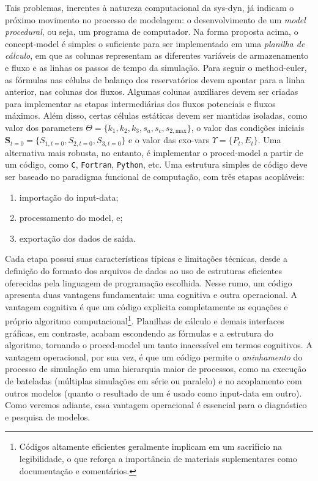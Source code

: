 \documentclass[./main.tex]{subfiles}
\begin{document}
\par Tais problemas, inerentes à natureza computacional da \gls{sys-dyn}, já indicam o próximo movimento no processo de modelagem: o desenvolvimento de um \textit{\gls{model} procedural}, ou seja, um programa de computador. Na forma proposta acima, o \gls{concept-model} é simples o suficiente para ser implementado em uma \textit{planilha de cálculo}, em que as colunas representam as diferentes variáveis de armazenamento e fluxo e as linhas os passos de tempo da simulação. Para seguir o \gls{method-euler}, as fórmulas nas células de balanço dos reservatórios devem apontar para a linha anterior, nas colunas dos fluxos. Algumas colunas auxiliares devem ser criadas para implementar as etapas intermediárias dos fluxos potenciais e fluxos máximos. Além disso, certas células estáticas devem ser mantidas isoladas, como valor dos \gls{parameters} $\Theta = \{k_1, k_2, k_3, s_a, s_c, s_{2, \text{max}}\}$, o valor das condições iniciais $\textbf{S}_{t=0} = \{S_{1, t=0}, S_{2, t=0}, S_{3, t=0}\}$ e o valor das \gls{exo-vars} $\Upsilon = \{P_t, E_t\}$. Uma alternativa mais robusta, no entanto, é implementar o \gls{proced-model} a partir de um código, como \texttt{C}, \texttt{Fortran}, \texttt{Python}, etc. Uma estrutura simples de código deve ser baseado no \gls{paradigma} funcional de computação, com três etapas acopláveis: 
\begin{enumerate}
    \item importação do \gls{input-data};
    \item processamento do \gls{model}, e;
    \item exportação dos dados de saída.
\end{enumerate}
Cada etapa possui suas características típicas e limitações técnicas, desde a definição do formato dos arquivos de dados ao uso de estruturas eficientes oferecidas pela linguagem de programação escolhida. Nesse rumo, um código apresenta duas vantagens fundamentais: uma cognitiva e outra operacional. A vantagem cognitiva é que um código explicita completamente as equações e próprio algoritmo computacional\footnote{Códigos altamente eficientes geralmente implicam em um sacrifício na legibilidade, o que reforça a importância de materiais suplementares como documentação e comentários.}. Planilhas de cálculo e demais interfaces gráficas, em contraste, acabam escondendo as fórmulas e a estrutura do algoritmo, tornando o \gls{proced-model} um tanto inacessível em termos cognitivos. A vantagem operacional, por sua vez, é que um código permite o \textit{aninhamento} do processo de simulação em uma hierarquia maior de processos, como na execução de bateladas (múltiplas simulações em série ou paralelo) e no acoplamento com outros modelos (quanto o resultado de um é usado como \gls{input-data} em outro). Como veremos adiante, essa vantagem operacional é essencial para o diagnóstico e pesquisa de modelos.
\end{document}
